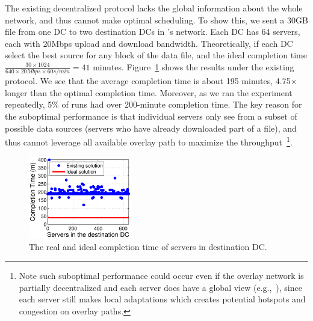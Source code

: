 The existing decentralized protocol lacks the global information
about the whole network, and thus cannot make optimal scheduling.
To show this, we sent a 30GB file from one DC to two destination 
DCs in \company's network. 
Each DC has 64 servers, each with 20Mbps upload and download 
bandwidth.
Theoretically, if each DC select
the best source for any block of the data file, and the ideal
completion time
$\frac{30\times 1024}{640\times 20Mbps \times 60s/min} = 41$
minutes.
Figure~\ref{fig:motivation} shows the results under the existing
protocol. We see that the average completion time is about
195 minutes, 4.75$\times$ longer than the optimal completion time.
Moreover, as we ran the experiment repeatedly,
5\% of runs had over 200-minute completion time. 
The key reason for the suboptimal performance is that 
individual servers only see from a subset of possible data sources 
(servers who have already downloaded part of a file), 
and thus cannot leverage all available overlay path to 
maximize the throughput~\footnote{Note such suboptimal performance 
could occur even if the overlay 
network is partially decentralized and each server does have a 
global view (e.g.,~\cite{VdnAtSigcomm13}), 
since each server still makes local adaptations which creates potential
hotspots and congestion on overlay paths.}. 


\begin{figure}[t]
  \centering
  \includegraphics[width=45mm]{images/SEvsIdeal.eps}
  \caption{The real and ideal completion time of servers in destination DC.}
  \label{fig:motivation}
\vspace{-0.4cm}
\end{figure}


